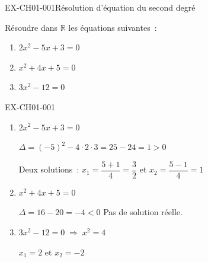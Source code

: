 
\begin{exercice}{EX-CH01-001}{Résolution d'équation du second degré}

Résoudre dans $\mathbb{R}$ les équations suivantes~:

\begin{enumerate}[label=\alph*)]
  \item $2x^2 - 5x + 3 = 0$
  \item $x^2 + 4x + 5 = 0$
  \item $3x^2 - 12 = 0$
\end{enumerate}

\end{exercice}

\begin{solution}{EX-CH01-001}

\begin{enumerate}[label=\alph*)]

  \item $2x^2 - 5x + 3 = 0$

  $\Delta = (-5)^2 - 4 \cdot 2 \cdot 3 = 25 - 24 = 1 > 0$

  Deux solutions~: $x_1 = \dfrac{5+1}{4} = \dfrac{3}{2}$ \quad et \quad
  $x_2 = \dfrac{5-1}{4} = 1$

  \item $x^2 + 4x + 5 = 0$

  $\Delta = 16 - 20 = -4 < 0$ \quad Pas de solution réelle.

  \item $3x^2 - 12 = 0 \;\Rightarrow\; x^2 = 4$

  $x_1 = 2$ \quad et \quad $x_2 = -2$

\end{enumerate}

\end{solution}
